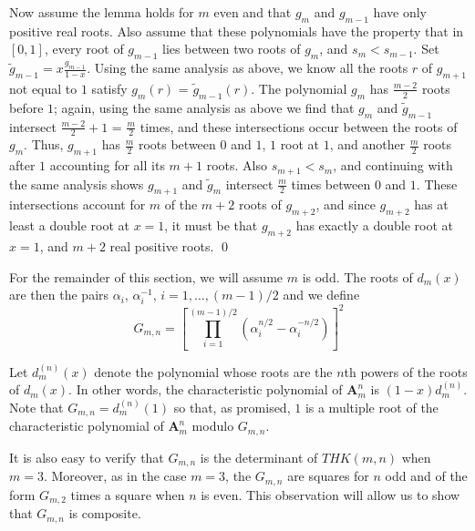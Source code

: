\documentclass{amsart}
\begin{document}
Now assume the lemma holds for $m$ even and that $g_m$ and $g_{m-1}$
have only positive real roots. Also assume that these polynomials
have the property that in $[0,1]$, every root of $g_{m-1}$ lies
between two roots of $g_m$, and $s_m < s_{m-1}$.  Set $\tilde
g_{m-1} = x\frac{g_{m-1}}{1-x}$. Using the same analysis as above,
we know all the roots $r$ of $g_{m+1}$ not equal to $1$ satisfy $g_m(r)$ =
$\tilde g_{m-1}(r)$. The polynomial $g_m$ has $\frac{m-2}{2}$ roots
before $1$; again, using the same analysis as above we find that
$g_m$ and $\tilde g_{m-1}$ intersect $\frac{m-2}{2} + 1$ =
$\frac{m}{2}$ times, and these intersections occur between the roots
of $g_m$. Thus, $g_{m+1}$ has $\frac{m}{2}$ roots between $0$ and
$1$, $1$ root at $1$, and another $\frac{m}{2}$ roots after $1$
accounting for all its $m+1$ roots. Also $s_{m+1} < s_m$, and
continuing with the same analysis shows $g_{m+1}$ and $\tilde g_m$
intersect $\frac{m}{2}$ times between $0$ and $1$.  These
intersections account for $m$ of the $m+2$ roots of $g_{m+2}$, and
since $g_{m+2}$ has at least a double root at $x = 1$, it must be
that $g_{m+2}$ has exactly a double root at $x = 1$, and $m+2$ real
positive roots. {\qed}

\medskip

For the remainder of this section, we will assume $m$ is odd.
The roots of $d_m(x)$ are then the
pairs $\alpha_i$, $\alpha_i^{-1}$, $i = 1, \ldots ,
(m-1)/2$ and we define
$$G_{m,n} = \left[
\prod_{i=1}^{(m-1)/2} (\alpha_i^{n/2} - \alpha_i^{-n/2}) \right]^2$$

Let $d_m^{(n)}(x)$ denote the polynomial whose roots are the
$n$th powers of the roots of $d_m(x)$. In other words, 
the characteristic polynomial of ${{\mathbf A}}_m^n$ is $(1-x)d_m^{(n)}$.
Note that $G_{m,n} = d_m^{(n)}(1)$ so that, as promised,
$1$ is a multiple root of the characteristic polynomial of ${{\mathbf A}}_m^n$ modulo 
$G_{m,n}$.

It is also easy to verify that $G_{m,n}$ is the determinant of 
$THK(m,n)$ when $m=3$. Moreover, 
as in the case $m=3$, the $G_{m,n}$  are squares for
$n$ odd and of the form $G_{m,2}$ times a square when $n$ is even. 
This observation will allow us to show that $G_{m,n}$ is composite.

\medskip
\end{document}

